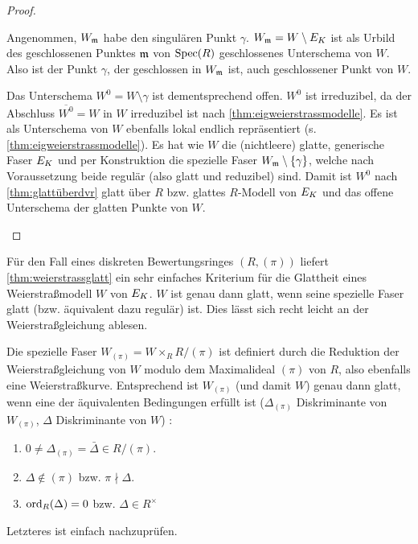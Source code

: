 \documentclass[german]{scrreprt}
\begin{document}
\begin{Lemma}
\begin{proof}
\begin{enumerate}[label=(\alph*)]
      Angenommen, $W_{\mathfrak{m}}$ habe den singulären Punkt $\gamma$.
      $W_{\mathfrak{m}}=W\setminus E_{K}$ ist als Urbild des geschlossenen Punktes
      $\mathfrak{m}$ von $\operatorname{Spec}(R)$ geschlossenes Unterschema von $W$.
      Also ist der Punkt $\gamma$, der geschlossen in $W_{\mathfrak{m}}$ ist, auch
      geschlossener Punkt von $W$.
      
      Das Unterschema $W^0=W\setminus\gamma$ ist dementsprechend offen.
      $W^0$ ist irreduzibel, da der Abschluss $\overline{W^0}=W$ in
      $W$ irreduzibel ist nach \autoref{thm:eigweierstrassmodelle}.
      Es ist als Unterschema von $W$ ebenfalls lokal endlich
      repräsentiert (s. \autoref{thm:eigweierstrassmodelle}).
      Es hat wie $W$ die (nichtleere) glatte, generische Faser $E_{K}$ und
      per Konstruktion die spezielle Faser $W_{\mathfrak{m}}\setminus\{\gamma\}$,
      welche nach Voraussetzung beide regulär (also glatt und reduzibel)
      sind.
      Damit ist $W^0$ nach \autoref{thm:glattüberdvr} glatt über $R$
      bzw. glattes $R$-Modell von $E_{K}$ und das offene Unterschema
      der glatten Punkte von $W$.
    \end{enumerate}
  \end{proof}
\end{Lemma}


\begin{Bemerkung}\label{thm:weierstraßmodellglatt}
  Für den Fall eines diskreten Bewertungsringes $(R,(\pi))$ liefert
  \autoref{thm:weierstrassglatt} ein sehr einfaches Kriterium für die
  Glattheit eines Weierstraßmodell $W$ von $E_{K}$.
  $W$ ist genau dann glatt, wenn seine spezielle Faser glatt
  (bzw. äquivalent dazu regulär) ist.
  Dies lässt sich recht leicht an der Weierstraßgleichung ablesen.
  
  Die spezielle Faser $W_{(\pi)}=W\times_R R/(\pi)$ ist definiert
  durch die Reduktion der Weierstraßgleichung von $W$ modulo dem
  Maximalideal $(\pi)$ von $R$, also ebenfalls eine Weierstraßkurve.
  Entsprechend ist $W_{(\pi)}$ (und damit $W$) genau dann glatt, wenn
  eine der äquivalenten Bedingungen erfüllt ist
  ($\Delta_{(\pi)}$ Diskriminante von $W_{(\pi)}$,
  $\Delta$ Diskriminante von $W$)
  \cite[Proposition VII.5.1 (a)]{silverman}:
  \begin{enumerate}[label=(\roman*)]
  \item $0\neq\Delta_{(\pi)}=\bar\Delta\in R/(\pi)$.
  \item $\Delta\not\in(\pi)$ bzw. $\pi\nmid\Delta$.
  \item $\operatorname{ord}_R(\Delta)=0$ bzw. $\Delta\in R^\times$
  \end{enumerate}
  Letzteres ist einfach nachzuprüfen.
\end{Bemerkung}
\end{document}
